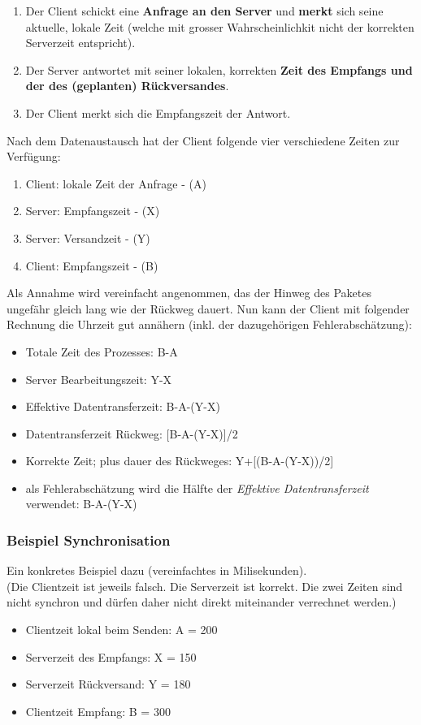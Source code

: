 \begin{enumerate}
\item Der Client schickt eine \textbf{Anfrage an den Server} und \textbf{merkt} sich seine aktuelle, lokale Zeit (welche mit grosser Wahrscheinlichkit nicht der korrekten Serverzeit entspricht).
\item Der Server antwortet mit seiner lokalen, korrekten \textbf{Zeit des Empfangs und der des (geplanten) Rückversandes}.
\item Der Client merkt sich die Empfangszeit der Antwort. 
\end{enumerate}
\vspace{1em}
Nach dem Datenaustausch hat der Client folgende vier verschiedene Zeiten zur Verfügung:
\begin{enumerate}
\item Client: lokale Zeit der Anfrage - (A)
\item Server: Empfangszeit - (X)
\item Server: Versandzeit - (Y)
\item Client: Empfangszeit - (B)
\end{enumerate}
\vspace{1em}
Als Annahme wird vereinfacht angenommen, das der Hinweg des Paketes ungefähr gleich lang wie der Rückweg dauert.
\vspace{1em}
Nun kann der Client mit folgender Rechnung die Uhrzeit gut annähern (inkl. der dazugehörigen Fehlerabschätzung):
\begin{itemize}
\item Totale Zeit des Prozesses: B-A
\item Server Bearbeitungszeit: Y-X
\item Effektive Datentransferzeit: B-A-(Y-X)
\item Datentransferzeit Rückweg: [B-A-(Y-X)]/2
\item Korrekte Zeit; plus dauer des Rückweges: Y+[(B-A-(Y-X))/2]
\item als Fehlerabschätzung wird die Hälfte der \textit{Effektive Datentransferzeit} verwendet: B-A-(Y-X)
\end{itemize}

\subsubsection{Beispiel Synchronisation}
Ein konkretes Beispiel dazu (vereinfachtes in Milisekunden).\\
\vspace{0em}
(Die Clientzeit ist jeweils falsch. Die Serverzeit ist korrekt. Die zwei Zeiten sind nicht synchron und dürfen daher nicht direkt miteinander verrechnet werden.)
\begin{itemize}
\item Clientzeit lokal beim Senden: A = 200
\item Serverzeit des Empfangs: X = 150
\item Serverzeit Rückversand: Y = 180
\item Clientzeit Empfang: B = 300
\end{itemize}

